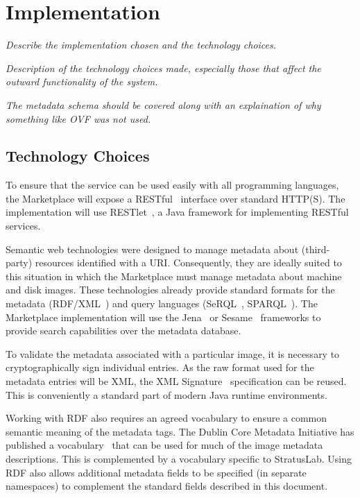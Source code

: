 \section{Implementation}
\label{sec:implementation}

{\em Describe the implementation chosen and the technology choices.}

{\em Description of the technology choices made, especially those that
  affect the outward functionality of the system.}

{\em The metadata schema should be covered along with an explaination
  of why something like OVF was not used.}

\subsection{Technology Choices}

To ensure that the service can be used easily with all programming
languages, the Marketplace will expose a RESTful~\cite{rest} interface
over standard HTTP(S).  The implementation will use
RESTlet~\cite{restlet}, a Java framework for implementing RESTful
services.

Semantic web technologies were designed to manage metadata about
(third-party) resources identified with a URI.  Consequently, they are
ideally suited to this situation in which the Marketplace must manage
metadata about machine and disk images.  These technologies already
provide standard formats for the metadata (RDF/XML~\cite{rdfxml,
  rdfprimer, rdfschema}) and query languages (SeRQL~\cite{serql},
SPARQL~\cite{sparql}).  The Marketplace implementation will use the
Jena~\cite{jena} or Sesame~\cite{sesame} frameworks to provide search
capabilities over the metadata database.

To validate the metadata associated with a particular image, it is
necessary to cryptographically sign individual entries.  As the raw
format used for the metadata entries will be XML, the XML
Signature~\cite{xmlsig} specification can be reused.  This is
conveniently a standard part of modern Java runtime environments.

Working with RDF also requires an agreed vocabulary to ensure a common
semantic meaning of the metadata tags.  The Dublin Core Metadata
Initiative has published a vocabulary~\cite{dcterms} that can be used
for much of the image metadata descriptions.  This is complemented by
a vocabulary specific to StratusLab.  Using RDF also allows additional
metadata fields to be specified (in separate namespaces) to complement
the standard fields described in this document.

